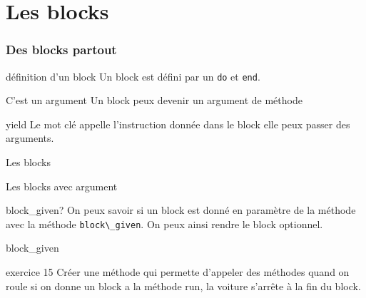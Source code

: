 \documentclass{beamer}
\begin{document}
\section{Les blocks}

\begin{frame}
  \frametitle{Des blocks partout}
  \begin{block}{d\'efinition d'un block}
    Un block est d\'efini par un \verb?do? et \verb?end?.
  \end{block}
  \begin{block}{C'est un argument}
    Un block peux devenir un argument de m\'ethode
  \end{block}
  \begin{block}{yield}
    Le mot cl\'e appelle l'instruction donn\'ee dans le block
    elle peux passer des arguments.
  \end{block}
\end{frame}

\begin{frame}
  \begin{beamerboxesrounded}{Les blocks}
    
  \end{beamerboxesrounded}
\end{frame}

\begin{frame}
  \begin{beamerboxesrounded}{Les blocks avec argument}
    
  \end{beamerboxesrounded}
\end{frame}

\begin{frame}
  \begin{block}{block\_given?}
    On peux savoir si un block est donn\'e en paramètre de la m\'ethode
    avec la m\'ethode \verb?block\_given?. On peux ainsi rendre le block
    optionnel.
  \end{block}
\end{frame}

\begin{frame}
  \begin{beamerboxesrounded}{block\_given}
    
  \end{beamerboxesrounded}
\end{frame}

\begin{frame}
  \begin{block}{exercice 15}
    Cr\'eer une m\'ethode qui permette d'appeler des m\'ethodes quand on roule
    si on donne un block a la m\'ethode run, la voiture s'arrête à la fin du block.
  \end{block}
\end{frame}
\end{document}
